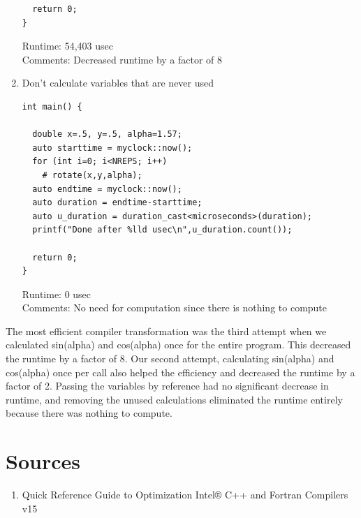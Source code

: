 \documentclass{report}
\begin{document}
\begin{enumerate}
\begin{lstlisting}
  return 0;
}
\end{lstlisting}
Runtime: 54,403 usec
\\Comments: Decreased runtime by a factor of 8

\vspace{12pt}
\item Don’t calculate variables that are never used
\begin{verbatim}
int main() {

  double x=.5, y=.5, alpha=1.57;
  auto starttime = myclock::now();
  for (int i=0; i<NREPS; i++)
    # rotate(x,y,alpha);
  auto endtime = myclock::now();
  auto duration = endtime-starttime;
  auto u_duration = duration_cast<microseconds>(duration);
  printf("Done after %lld usec\n",u_duration.count());

  return 0;
}
\end{verbatim}
Runtime: 0 usec
\\Comments: No need for computation since there is nothing to compute

\end{enumerate}

The most efficient compiler transformation was the third attempt when we calculated sin(alpha) and cos(alpha) once for the entire program. This decreased the runtime by a factor of 8. Our second attempt, calculating sin(alpha) and cos(alpha) once per call also helped the efficiency and decreased the runtime by a factor of 2. Passing the variables by reference had no significant decrease in runtime, and removing the unused calculations eliminated the runtime entirely because there was nothing to compute. 

\newpage
\section*{Sources}
\begin{enumerate}
\item Quick Reference Guide to Optimization Intel® C++ and Fortran Compilers v15 
\end{enumerate}
\end{document}
